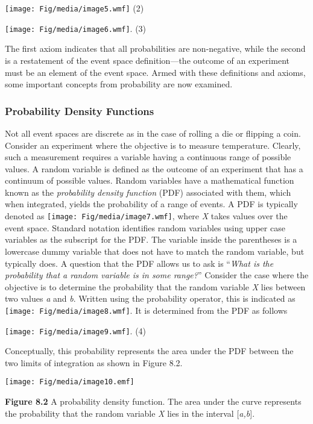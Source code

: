 \texttt{[image: Fig/media/image5.wmf]} (2)

\texttt{[image: Fig/media/image6.wmf]}. (3)

The first axiom indicates that all probabilities are non-negative, while
the second is a restatement of the event space definition---the outcome
of an experiment must be an element of the event space. Armed with these
definitions and axioms, some important concepts from probability are now
examined.

\subsubsection{Probability Density
Functions}\label{probability-density-functions}

Not all event spaces are discrete as in the case of rolling a die or
flipping a coin. Consider an experiment where the objective is to
measure temperature. Clearly, such a measurement requires a variable
having a continuous range of possible values. A random variable is
defined as the outcome of an experiment that has a continuum of possible
values. Random variables have a mathematical function known as the
\emph{probability density function} (PDF) associated with them, which
when integrated, yields the probability of a range of events. A PDF is
typically denoted as \texttt{[image: Fig/media/image7.wmf]}, where
\emph{X} takes values over the event space. Standard notation identifies
random variables using upper case variables as the subscript for the
PDF. The variable inside the parentheses is a lowercase dummy variable
that does not have to match the random variable, but typically does. A
question that the PDF allows us to ask is ``\emph{What is the
probability that a random variable is in some range?}'' Consider the
case where the objective is to determine the probability that the random
variable \emph{X} lies between two values \emph{a} and \emph{b}. Written
using the probability operator, this is indicated as
\texttt{[image: Fig/media/image8.wmf]}. It is determined from the PDF as
follows

\texttt{[image: Fig/media/image9.wmf]}. (4)

Conceptually, this probability represents the area under the PDF between
the two limits of integration as shown in Figure 8.2.

\texttt{[image: Fig/media/image10.emf]}

\textbf{Figure 8.2} A probability density function. The area under the
curve represents the probability that the random variable \emph{X} lies
in the interval {[}\emph{a,b}{]}.

